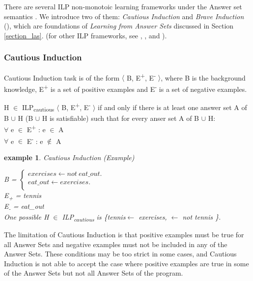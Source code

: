 \documentclass[12pt,twoside]{report}
\newtheorem{examp}{example}[section]
\begin{document}
There are several ILP non-monotoic learning frameworks under the Answer set semantics . We introduce two of them: \textit{Cautious Induction} and \textit{Brave Induction} (\cite{Sakama2009}), which are foundations of \textit{Learning from Answer Sets} discussed in Section \ref{section_las}.  (for other ILP frameworks, see \cite{Otero2001}, \cite{Inoue2014}, \cite{Corapi2012} and \cite{DeRaedt1997}).
\subsubsection{Cautious Induction}
Cautious Induction task is of the form $\langle$ B, E\textsuperscript{+}, E\textsuperscript{-} $\rangle$, where B is the background knowledge, E\textsuperscript{+} is a set of positive examples and E\textsuperscript{-} is a set of negative examples.

 H $\in$ ILP\textsubscript{cautious} $\langle$ B, E\textsuperscript{+}, E\textsuperscript{-} $\rangle$ if and only if  there is at least one answer set A of B $\cup$ H (B $\cup$ H is satisfiable) such that for every anser set A of B $\cup$ H: \\
$\forall$ e $\in$ E\textsuperscript{+} : e $\in$ A \\
$\forall$ e $\in$ E\textsuperscript{-} : e $\notin$ A \\

\begin{examp} \normalfont Cautious Induction (Example)

B = $\begin{cases}
	exercises  \leftarrow not \ eat\_out. \\
	eat\_out \leftarrow exercises. \\
      \end{cases}$ \\
E\textsubscript{+} = tennis \\
E\textsubscript{-} = eat\_out \\
One possible  H $\in$ ILP\textsubscript{cautious} is \{tennis$ \leftarrow$ exercises, $\leftarrow$ not tennis \}.
\end{examp}
\label{cautious_induction_example}

The limitation of Cautious Induction is that positive examples must be true for all Answer Sets and negative examples must not be included in any of the Answer Sets. These conditions may be too strict in some cases, and Cautious Induction is not able to accept the case where positive examples are true in some of the Answer Sets but not all Answer Sets of the program.
\end{document}
